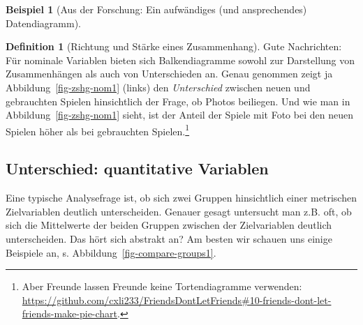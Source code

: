 \documentclass[
  a4paper,
]{scrbook}
\theoremstyle{definition}
\newtheorem{example}{Beispiel}[chapter]
\theoremstyle{definition}
\newtheorem{definition}{Definition}[chapter]
\theoremstyle{definition}
\theoremstyle{remark}
\begin{document}
\begin{example}[Aus der Forschung: Ein aufwändiges (und ansprechendes)
Datendiagramm]
\begin{definition}[Richtung und Stärke eines
Zusammenhang]
Gute Nachrichten: Für nominale Variablen bieten sich Balkendiagramme
sowohl zur Darstellung von Zusammenhängen als auch von Unterschieden an.
Genau genommen zeigt ja Abbildung~\ref{fig-zshg-nom1} (links) den
\emph{Unterschied} zwischen neuen und gebrauchten Spielen hinsichtlich
der Frage, ob Photos beiliegen. Und wie man in
Abbildung~\ref{fig-zshg-nom1} sieht, ist der Anteil der Spiele mit Foto
bei den neuen Spielen höher als bei gebrauchten Spielen.\footnote{Aber
  Freunde lassen Freunde keine Tortendiagramme verwenden:
  \url{https://github.com/cxli233/FriendsDontLetFriends\#10-friends-dont-let-friends-make-pie-chart}.}

\subsection{Unterschied: quantitative
Variablen}\label{unterschied-quantitative-variablen}

Eine typische Analysefrage ist, ob sich zwei Gruppen hinsichtlich einer
metrischen Zielvariablen deutlich unterscheiden. Genauer gesagt
untersucht man z.B. oft, ob sich die Mittelwerte der beiden Gruppen
zwischen der Zielvariablen deutlich unterscheiden. Das hört sich
abstrakt an? Am besten wir schauen uns einige Beispiele an, s.
Abbildung~\ref{fig-compare-groups1}.

\begin{figure}

\begin{minipage}{0.50\linewidth}




\end{minipage}
\end{figure}
\end{definition}
\end{example}
\end{document}
